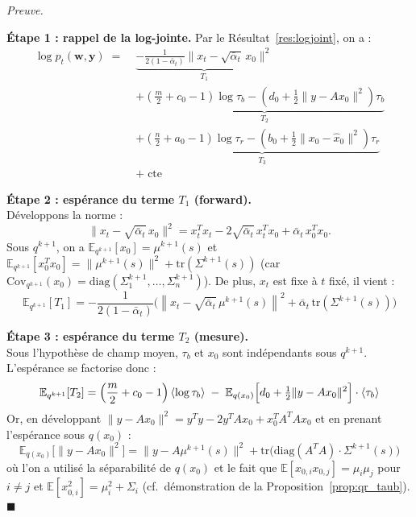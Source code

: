 \documentclass[12pt]{article}
\newcommand{\alt}{\bar\alpha_t}
\renewcommand{\qedsymbol}{$\blacksquare$}
\renewenvironment{proof}[1][\proofname]{%
  \par\medskip\noindent
  \textit{\color{proofgray}#1.}\enspace\ignorespaces
}{\hfill\qedsymbol\par\medskip}
\renewcommand{\proofname}{Preuve}
\begin{document}
\begin{proof}
\textbf{Étape 1 : rappel de la log-jointe.}
Par le Résultat~\ref{res:logjoint}, on a :
\begin{equation*}
    \begin{aligned}
        \log p_t(\boldsymbol{w}, \boldsymbol{y}) \;=\;
        &\underbrace{-\frac{1}{2(1-\bar\alpha_t)}\|x_t - \sqrt{\bar\alpha_t}\, x_0\|^2}_{T_1} \\[4pt]
        &+ \underbrace{\left(\frac{m}{2} + c_0 - 1\right)\log\tau_b - \left(d_0 + \tfrac{1}{2}\|y - Ax_0\|^2\right)\tau_b}_{T_2} \\[4pt]
        &+ \underbrace{\left(\frac{n}{2} + a_0 - 1\right)\log\tau_r - \left(b_0 + \tfrac{1}{2}\|x_0 - \hat{x}_0\|^2\right)\tau_r}_{T_3} \\[4pt]
        &+ \;\mathrm{cte}
    \end{aligned}
\end{equation*}

\medskip
\textbf{Étape 2 : espérance du terme $T_1$ (forward).}\\
Développons la norme :
\begin{equation*}
\|x_t - \sqrt{\alt}\, x_0\|^2 = x_t^T x_t - 2\sqrt{\alt}\, x_t^T x_0 + \alt\, x_0^T x_0.
\end{equation*}
Sous $q^{k+1}$, on a $\mathbb{E}_{q^{k+1}}[x_0] = \mu^{k+1}(s)$ et $\mathbb{E}_{q^{k+1}}[x_0^T x_0] = \|\mu^{k+1}(s)\|^2 + \mathrm{tr}(\Sigma^{k+1}(s))$ (car $\mathrm{Cov}_{q^{k+1}}(x_0) = \mathrm{diag}(\Sigma_1^{k+1}, \ldots, \Sigma_n^{k+1})$). De plus, $x_t$ est fixe à $t$ fixé, il vient :
\begin{equation*}
\mathbb{E}_{q^{k+1}}[T_1] = -\frac{1}{2(1-\bar\alpha_t)} \Biggl(
\left\| x_t - \sqrt{\alt}\,\mu^{k+1}(s)\right\|^2 + \alt\, \mathrm{tr}(\Sigma^{k+1}(s))
\Biggr)
\end{equation*}

\medskip

\textbf{Étape 3 : espérance du terme $T_2$ (mesure).}\\
Sous l'hypothèse de champ moyen, $\tau_b$ et $x_0$ sont indépendants sous $q^{k+1}$. L'espérance se factorise donc :
\begin{equation*}
\mathbb{E}_{q^{k+1}}[T_2] = \Bigl(\frac{m}{2} + c_0 - 1\Bigr)\, \langle\log\tau_b\rangle
\;-\; \mathbb{E}_{q(x_0)}\Bigl[d_0 + \tfrac{1}{2}\|y - Ax_0\|^2\Bigr]\cdot \langle\tau_b\rangle
\end{equation*}
Or, en développant $\|y - Ax_0\|^2 = y^Ty - 2y^TAx_0 + x_0^TA^TAx_0$ et en prenant l'espérance sous $q(x_0)$ :
\begin{equation*}
\mathbb{E}_{q(x_0)}\bigl[\|y - Ax_0\|^2\bigr]
= \|y - A\mu^{k+1}(s)\|^2 + \mathrm{tr}\bigl(\mathrm{diag}(A^TA)\cdot \Sigma^{k+1}(s)\bigr)
\end{equation*}
où l'on a utilisé la séparabilité de $q(x_0)$ et le fait que $\mathbb{E}[x_{0,i}x_{0,j}] = \mu_i\mu_j$ pour $i \neq j$ et $\mathbb{E}[x_{0,i}^2] = \mu_i^2 + \Sigma_i$ (cf.~démonstration de la Proposition~\ref{prop:qr_taub}).\\


\end{proof}
\end{document}

